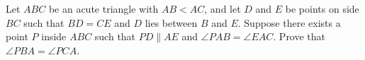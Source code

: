 Let $ABC$ be an acute triangle with $AB<AC$, and let $D$ and $E$ be points on side $BC$ such that $BD=CE$ and $D$ lies between $B$ and $E$. Suppose there exists a point $P$ inside $ABC$ such that $PD\parallel AE$ and $\angle PAB=\angle EAC$. Prove that $\angle PBA=\angle PCA$.